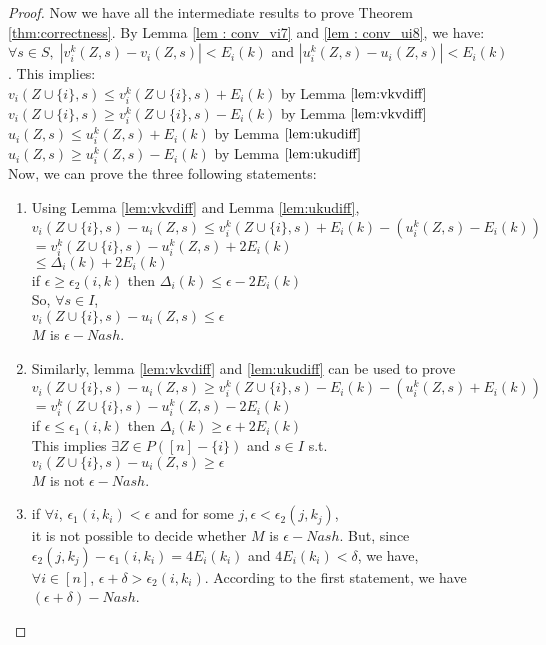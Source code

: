 \begin{proof}
Now we have all the intermediate results to prove Theorem \ref{thm:correctness}. By Lemma \ref{lem : conv_vi7} and \ref{lem : conv_ui8}, we have:  $\forall s \in S,\;|v_i^{k}(Z,s)-v_i(Z,s)| < E_i(k)$ and $|u_i^{k}(Z,s) - u_i(Z,s)| < E_i(k)$. This implies:\\
$v_i(Z \cup \{i\},s) \le v_i^{k}(Z \cup \{i\},s) + E_i(k)$  by Lemma $ \ref{lem:vkvdiff}$\\
$v_i(Z \cup \{i\},s) \ge v_i^{k}(Z \cup \{i\},s) - E_i(k)$  by Lemma $ \ref{lem:vkvdiff}$\\
$u_i(Z ,s) \le u_i^{k}(Z ,s) + E_i(k)$  by Lemma $ \ref{lem:ukudiff}$\\
$u_i(Z ,s) \ge u_i^{k}(Z ,s) - E_i(k)$  by Lemma $ \ref{lem:ukudiff}$\\

Now, we can prove the three following statements:
\begin{enumerate}
	\item Using Lemma \ref{lem:vkvdiff} and Lemma \ref{lem:ukudiff},\\
	$v_i(Z \cup \{i\},s) - u_i(Z ,s) \le v_i^{k}(Z \cup \{i\},s) + E_i(k) - (u_i^{k}(Z ,s) - E_i(k) )$\\
	$=v_i^{k}(Z \cup \{i\},s) - u_i^{k}(Z ,s) + 2E_i(k)  $\\
	$\le \Delta_i(k) + 2E_i(k) $\\
	if $\epsilon \ge \epsilon_2(i,k)$ then $\Delta_i(k) \le \epsilon - 2E_i(k)$\\
	So, $\forall s \in I$, \\
	$v_i(Z \cup \{i\},s) - u_i(Z ,s) \le \epsilon$\\
	$M$ is $\epsilon-Nash$.
	\item Similarly, lemma \ref{lem:vkvdiff} and \ref{lem:ukudiff} can be used to prove\\
	$v_i(Z \cup \{i\},s) - u_i(Z ,s) \ge v_i^{k}(Z \cup \{i\},s) - E_i(k) - (u_i^{k}(Z ,s) + E_i(k) )$\\
	$=v_i^{k}(Z \cup \{i\},s) - u_i^{k}(Z ,s) - 2E_i(k)  $\\
	if $\epsilon \le \epsilon_1(i,k)$ then $\Delta_i(k) \ge \epsilon + 2E_i(k)$\\
	This implies $\exists Z \in P([n]-\{i\})$ and $s \in I$ s.t.\\
	$v_i(Z \cup \{i\},s) - u_i(Z ,s) \ge \epsilon$\\
	$M$ is not $\epsilon-Nash$.
	\item if $\forall i$, $\epsilon_1(i,k_i) < \epsilon$ and for some $j, \epsilon < \epsilon_2(j,k_j)$, \\
	it is not possible to decide whether $M$ is $\epsilon-Nash$. But, since $\epsilon_2(j,k_j)-\epsilon_1(i,k_i)= 4E_i(k_i)$ and $4E_i(k_i) < \delta$, we have,\\
	$\forall i \in [n]$, $\epsilon + \delta > \epsilon_2(i,k_i)$. According to the first statement, we have $(\epsilon + \delta)-Nash$.
\end{enumerate}
\end{proof}

